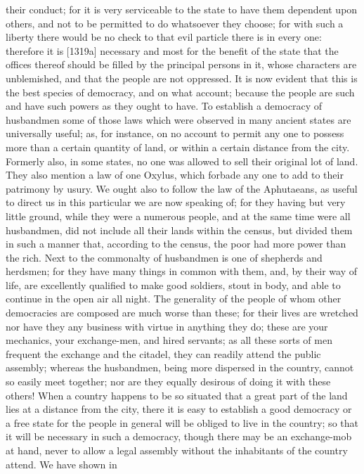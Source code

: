 their conduct; for it is very serviceable to the state to have them
dependent upon others, and not to be permitted to do whatsoever they
choose; for with such a liberty there would be no check to that evil
particle there is in every one: therefore it is [1319a] necessary and most
for the benefit of the state that the offices thereof should be filled by
the principal persons in it, whose characters are unblemished, and that
the people are not oppressed. It is now evident that this is the best
species of democracy, and on what account; because the people are such and
have such powers as they ought to have. To establish a democracy of
husbandmen some of those laws which were observed in many ancient states
are universally useful; as, for instance, on no account to permit any one
to possess more than a certain quantity of land, or within a certain
distance from the city. Formerly also, in some states, no one was allowed
to sell their original lot of land. They also mention a law of one Oxylus,
which forbade any one to add to their patrimony by usury. We ought also to
follow the law of the Aphutaeans, as useful to direct us in this
particular we are now speaking of; for they having but very little ground,
while they were a numerous people, and at the same time were all
husbandmen, did not include all their lands within the census, but divided
them in such a manner that, according to the census, the poor had more
power than the rich. Next to the commonalty of husbandmen is one of
shepherds and herdsmen; for they have many things in common with them,
and, by their way of life, are excellently qualified to make good
soldiers, stout in body, and able to continue in the open air all night.
The generality of the people of whom other democracies are composed are
much worse than these; for their lives are wretched nor have they any
business with virtue in anything they do; these are your mechanics, your
exchange-men, and hired servants; as all these sorts of men frequent the
exchange and the citadel, they can readily attend the public assembly;
whereas the husbandmen, being more dispersed in the country, cannot so
easily meet together; nor are they equally desirous of doing it with these
others! When a country happens to be so situated that a great part of the
land lies at a distance from the city, there it is easy to establish a
good democracy or a free state for the people in general will be obliged
to live in the country; so that it will be necessary in such a democracy,
though there may be an exchange-mob at hand, never to allow a legal
assembly without the inhabitants of the country attend. We have shown in
